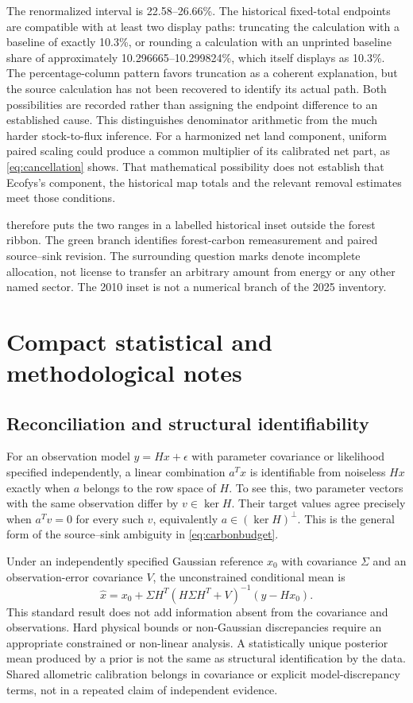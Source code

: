 \documentclass[11pt,a4paper]{article}
\theoremstyle{remark}
\begin{document}
The renormalized interval is 22.58--26.66\%. The historical fixed-total endpoints are compatible with at least two display paths: truncating the calculation with a baseline of exactly 10.3\%, or rounding a calculation with an unprinted baseline share of approximately 10.296665--10.299824\%, which itself displays as 10.3\%. The percentage-column pattern favors truncation as a coherent explanation, but the source calculation has not been recovered to identify its actual path. Both possibilities are recorded rather than assigning the endpoint difference to an established cause. This distinguishes denominator arithmetic from the much harder stock-to-flux inference. For a harmonized net land component, uniform paired scaling could produce a common multiplier of its calibrated net part, as \eqref{eq:cancellation} shows. That mathematical possibility does not establish that Ecofys's component, the historical map totals and the relevant removal estimates meet those conditions.

 therefore puts the two ranges in a labelled historical inset outside the forest ribbon. The green branch identifies forest-carbon remeasurement and paired source--sink revision. The surrounding question marks denote incomplete allocation, not license to transfer an arbitrary amount from energy or any other named sector. The 2010 inset is not a numerical branch of the 2025 inventory.


\section{Compact statistical and methodological notes}
\subsection{Reconciliation and structural identifiability}
For an observation model $y=Hx+\epsilon$ with parameter covariance or likelihood specified independently, a linear combination $a^Tx$ is identifiable from noiseless $Hx$ exactly when $a$ belongs to the row space of $H$. To see this, two parameter vectors with the same observation differ by $v\in\ker H$. Their target values agree precisely when $a^Tv=0$ for every such $v$, equivalently $a\in(\ker H)^\perp$. This is the general form of the source--sink ambiguity in \eqref{eq:carbonbudget}.

Under an independently specified Gaussian reference $x_0$ with covariance $\Sigma$ and an observation-error covariance $V$, the unconstrained conditional mean is
\begin{equation}
\hat x=x_0+\Sigma H^T(H\Sigma H^T+V)^{-1}(y-Hx_0).
\label{eq:reconciliation}
\end{equation}
This standard result does not add information absent from the covariance and observations. Hard physical bounds or non-Gaussian discrepancies require an appropriate constrained or non-linear analysis. A statistically unique posterior mean produced by a prior is not the same as structural identification by the data. Shared allometric calibration belongs in covariance or explicit model-discrepancy terms, not in a repeated claim of independent evidence.
\end{document}
